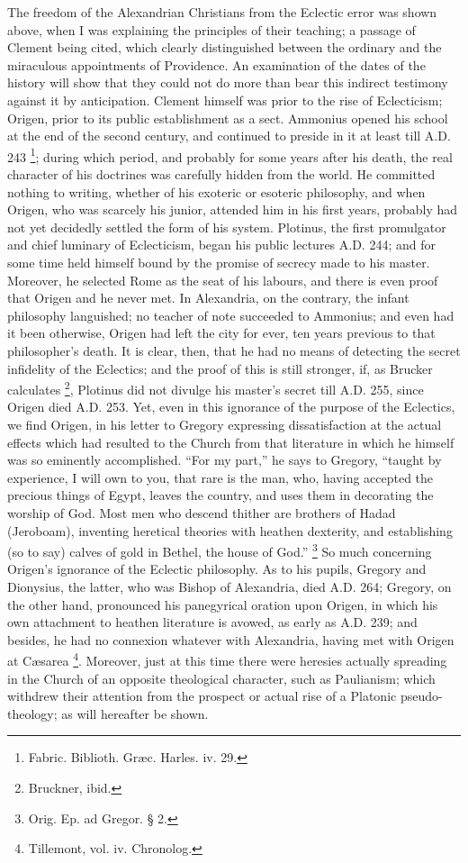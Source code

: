 The freedom of the Alexandrian Christians from the Eclectic error
was shown above, when I was explaining the principles of their
teaching; a passage of Clement being cited, which clearly
distinguished between the ordinary and the miraculous appointments of
Providence. An examination of the dates of the history will show
that they could not do more than bear this indirect testimony against
it by anticipation. Clement himself was prior to the rise of
Eclecticism; Origen, prior to its public establishment as a sect.
Ammonius opened his school at the end of the second century, and
continued to preside in it at least till A.D.
243 \footnote{Fabric. Biblioth. Græc. Harles. iv. 29.}; during which period,
and probably for some years after his death, the real character of his
doctrines was carefully hidden from the world. He committed nothing to
writing, whether of his exoteric or esoteric philosophy, and when
Origen, who was scarcely his junior, attended him in his first years,
probably had not yet decidedly settled the form of his system.
Plotinus, the first promulgator and chief luminary of Eclecticism,
began his public lectures A.D. 244; and for some
time held himself bound by the promise of secrecy made to his master.
Moreover, he selected Rome as the seat of his labours, and there is
even proof that Origen and he never met. In Alexandria, on the
contrary, the infant philosophy languished; no teacher of note
succeeded to Ammonius; and even had it been otherwise, Origen had left
the city for ever, ten years previous to that philosopher's death. It
is clear, then, that he had no means of detecting the secret
infidelity of the Eclectics; and the proof of this is still stronger,
if, as Brucker calculates \footnote{Bruckner, ibid.},
Plotinus did not divulge his master's secret till A.D.
255, since Origen died A.D. 253. Yet, even in
this ignorance of the purpose of the Eclectics, we find Origen, in his
letter to Gregory expressing dissatisfaction at the actual
effects which had resulted to the Church from that literature in which
he himself was so eminently accomplished. ``For my part,'' he
says to Gregory, ``taught by experience, I will own to you, that
rare is the man, who, having accepted the precious things of Egypt,
leaves the country, and uses them in decorating the worship of God.
Most men who descend thither are brothers of Hadad (Jeroboam),
inventing heretical theories with heathen dexterity, and establishing
(so to say) calves of gold in Bethel, the house of God.'' \footnote{Orig. Ep. ad Gregor. § 2.} So much concerning Origen's ignorance of the Eclectic
philosophy. As to his pupils, Gregory and Dionysius, the latter, who
was Bishop of Alexandria, died A.D. 264;
Gregory, on the other hand, pronounced his panegyrical oration upon
Origen, in which his own attachment to heathen literature is avowed,
as early as A.D. 239; and besides, he had no
connexion whatever with Alexandria, having met with Origen at Cæsarea
\footnote{Tillemont, vol. iv. Chronolog.}. Moreover, just at
this time there were heresies actually spreading in the Church of an
opposite theological character, such as Paulianism; which withdrew
their attention from the prospect or actual rise of a Platonic
pseudo-theology; as will hereafter be shown.

